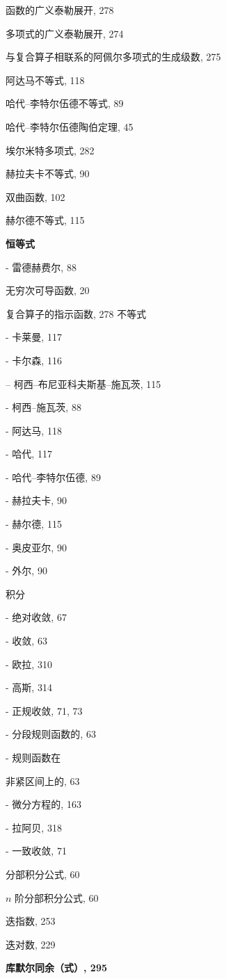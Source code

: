 函数的广义泰勒展开, 278

多项式的广义泰勒展开, 274

与复合算子相联系的阿佩尔多项式的生成级数, 275

阿达马不等式, 118

哈代–李特尔伍德不等式, 89

哈代–李特尔伍德陶伯定理, 45

埃尔米特多项式, 282

赫拉夫卡不等式, 90

双曲函数, 102

赫尔德不等式, 115

\par\noindent\textbf{恒等式}\par

- 雷德赫费尔, 88

无穷次可导函数, 20

复合算子的指示函数, 278 不等式

- 卡莱曼, 117

- 卡尔森, 116

-- 柯西–布尼亚科夫斯基–施瓦茨, 115

- 柯西–施瓦茨, 88

- 阿达马, 118

- 哈代, 117

- 哈代–李特尔伍德, 89

- 赫拉夫卡, 90

- 赫尔德, 115

- 奥皮亚尔, 90

- 外尔, 90

积分

- 绝对收敛, 67

- 收敛, 63

- 欧拉, 310

- 高斯, 314

- 正规收敛, 71, 73

- 分段规则函数的, 63

- 规则函数在

非紧区间上的, 63

- 微分方程的, 163

- 拉阿贝, 318

- 一致收敛, 71

分部积分公式, 60

\(n\) 阶分部积分公式, 60

迭指数, 253

迭对数, 229

\par\noindent\textbf{库默尔同余（式）, 295}\par

